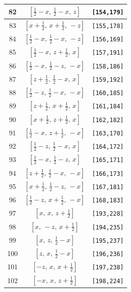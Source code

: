 \documentclass[fleqn,8pt]{jsarticle}
\begin{document}
\begin{longtable}{ccc}
82 & $\left[ \frac{1}{2} - x,\, \frac{1}{2} - x,\, z \right]$ & {\tt [154,179]} \\ \hline
83 & $\left[ x + \frac{1}{2},\, x + \frac{1}{2},\, - z \right]$ & {\tt [155,178]} \\ \hline
84 & $\left[ \frac{1}{2} - x,\, \frac{1}{2} - x,\, - z \right]$ & {\tt [156,169]} \\ \hline
85 & $\left[ \frac{1}{2} - x,\, z + \frac{1}{2},\, x \right]$ & {\tt [157,191]} \\ \hline
86 & $\left[ \frac{1}{2} - x,\, \frac{1}{2} - z,\, - x \right]$ & {\tt [158,186]} \\ \hline
87 & $\left[ z + \frac{1}{2},\, \frac{1}{2} - x,\, x \right]$ & {\tt [159,192]} \\ \hline
88 & $\left[ \frac{1}{2} - z,\, \frac{1}{2} - x,\, - x \right]$ & {\tt [160,185]} \\ \hline
89 & $\left[ z + \frac{1}{2},\, x + \frac{1}{2},\, x \right]$ & {\tt [161,184]} \\ \hline
90 & $\left[ x + \frac{1}{2},\, z + \frac{1}{2},\, x \right]$ & {\tt [162,182]} \\ \hline
91 & $\left[ \frac{1}{2} - x,\, z + \frac{1}{2},\, - x \right]$ & {\tt [163,170]} \\ \hline
92 & $\left[ \frac{1}{2} - z,\, \frac{1}{2} - x,\, x \right]$ & {\tt [164,172]} \\ \hline
93 & $\left[ \frac{1}{2} - x,\, \frac{1}{2} - z,\, x \right]$ & {\tt [165,171]} \\ \hline
94 & $\left[ z + \frac{1}{2},\, \frac{1}{2} - x,\, - x \right]$ & {\tt [166,173]} \\ \hline
95 & $\left[ x + \frac{1}{2},\, \frac{1}{2} - z,\, - x \right]$ & {\tt [167,181]} \\ \hline
96 & $\left[ \frac{1}{2} - z,\, x + \frac{1}{2},\, - x \right]$ & {\tt [168,183]} \\ \hline
97 & $\left[ x,\, x,\, z + \frac{1}{2} \right]$ & {\tt [193,228]} \\ \hline
98 & $\left[ x,\, - z,\, x + \frac{1}{2} \right]$ & {\tt [194,235]} \\ \hline
99 & $\left[ x,\, z,\, \frac{1}{2} - x \right]$ & {\tt [195,237]} \\ \hline
100 & $\left[ z,\, x,\, \frac{1}{2} - x \right]$ & {\tt [196,236]} \\ \hline
101 & $\left[ - z,\, x,\, x + \frac{1}{2} \right]$ & {\tt [197,238]} \\ \hline
102 & $\left[ - x,\, x,\, z + \frac{1}{2} \right]$ & {\tt [198,224]} \\ \hline

\end{longtable}
\end{document}
